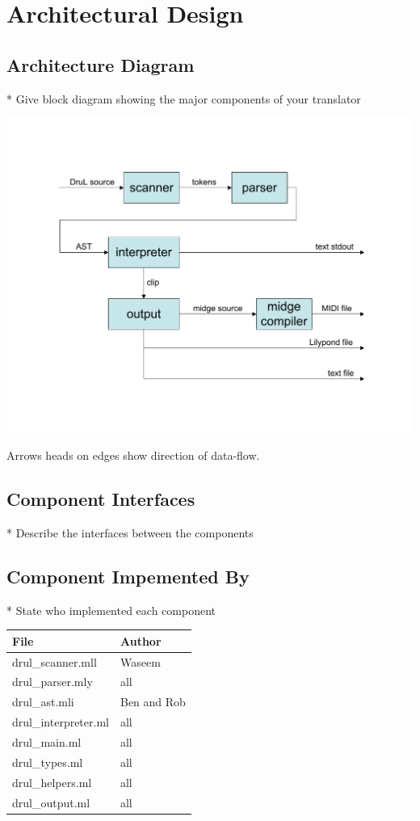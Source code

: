 
\chapter{Architectural Design}

\section{Architecture Diagram}
* Give block diagram showing the major components of your translator

\includegraphics[width=150mm]{Architecture_diagram.pdf}

Arrows heads on edges show direction of data-flow.

\section{Component Interfaces}
* Describe the interfaces between the components

\section{Component Impemented By}
* State who implemented each component

\begin{tabular}{ | l | l | } \hline

	\textbf{File}        & \textbf{Author} \\ \hline \hline
	drul\_scanner.mll    & Waseem          \\ \hline
	drul\_parser.mly     & all             \\ \hline
	drul\_ast.mli        & Ben and Rob     \\ \hline
	drul\_interpreter.ml & all             \\ \hline
	drul\_main.ml        & all             \\ \hline
	drul\_types.ml       & all             \\ \hline
	drul\_helpers.ml     & all             \\ \hline
	drul\_output.ml      & all             \\ \hline

\end{tabular}
